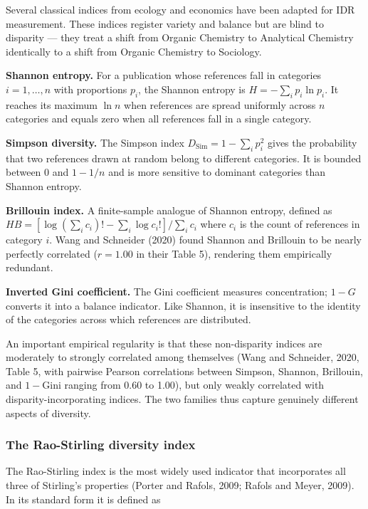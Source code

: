 \documentclass[
]{article}
\begin{document}
Several classical indices from ecology and economics have been adapted
for IDR measurement. These indices register variety and balance but are
blind to disparity --- they treat a shift from Organic Chemistry to
Analytical Chemistry identically to a shift from Organic Chemistry to
Sociology.

\textbf{Shannon entropy.} For a publication whose references fall in
categories \(i = 1, \ldots, n\) with proportions \(p_i\), the Shannon
entropy is \(H = -\sum_{i} p_i \ln p_i\). It reaches its maximum
\(\ln n\) when references are spread uniformly across \(n\) categories
and equals zero when all references fall in a single category.

\textbf{Simpson diversity.} The Simpson index
\(D_{\mathrm{Sim}} = 1 - \sum_i p_i^2\) gives the probability that two
references drawn at random belong to different categories. It is bounded
between 0 and \(1 - 1/n\) and is more sensitive to dominant categories
than Shannon entropy.

\textbf{Brillouin index.} A finite-sample analogue of Shannon entropy,
defined as \(HB = [\log(\sum_i c_i)! - \sum_i \log c_i!] / \sum_i c_i\)
where \(c_i\) is the count of references in category \(i\). Wang and
Schneider (2020) found Shannon and Brillouin to be nearly perfectly
correlated (\(r = 1.00\) in their Table 5), rendering them empirically
redundant.

\textbf{Inverted Gini coefficient.} The Gini coefficient measures
concentration; \(1 - G\) converts it into a balance indicator. Like
Shannon, it is insensitive to the identity of the categories across
which references are distributed.

An important empirical regularity is that these non-disparity indices
are moderately to strongly correlated among themselves (Wang and
Schneider, 2020, Table 5, with pairwise Pearson correlations between
Simpson, Shannon, Brillouin, and \(1 - \text{Gini}\) ranging from 0.60
to 1.00), but only weakly correlated with disparity-incorporating
indices. The two families thus capture genuinely different aspects of
diversity.

\hypertarget{the-rao-stirling-diversity-index}{%
\subsubsection{The Rao-Stirling diversity
index}\label{the-rao-stirling-diversity-index}}

The Rao-Stirling index is the most widely used indicator that
incorporates all three of Stirling's properties (Porter and Rafols,
2009; Rafols and Meyer, 2009). In its standard form it is defined as
\end{document}
